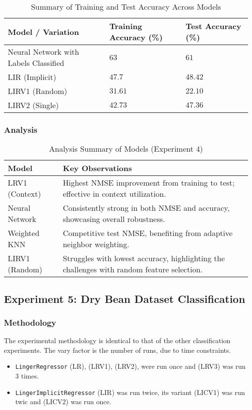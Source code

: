 \documentclass[a4paper, 12pt]{report}
\begin{document}
\begin{table}[H]
    \centering
    \caption{Summary of Training and Test Accuracy Across Models}
    \label{tab:summary_accuracy_all_models_accuracy_exp4}
    \small
    \begin{tabular}{|l|l|l|}
    \toprule
    \textbf{Model / Variation} & \textbf{Training Accuracy (\%)} & \textbf{Test Accuracy (\%)} \\
    \midrule
    Neural Network with Labels Classified & $63$ & $61$ \\
    LIR (Implicit) & $47.7$ & $48.42$ \\
    LIRV1 (Random) & $31.61$ & $22.10$ \\
    LIRV2 (Single) & $42.73$ & $47.36$ \\
    \bottomrule
    \end{tabular}
\end{table}
\clearpage

\subsubsection{Analysis}
\begin{table}[H]
    \centering
    \caption{Analysis Summary of Models (Experiment 4)}
    \label{tab:concise_analysis_summary_exp4}
    \begin{tabular}{|l|l|}
    \hline
    \textbf{Model} & \textbf{Key Observations} \\
    \hline
    LRV1 (Context) & Highest NMSE improvement from training to test; effective in context utilization. \\
    \hline
    Neural Network & Consistently strong in both NMSE and accuracy, showcasing overall robustness. \\
    \hline
    Weighted KNN & Competitive test NMSE, benefiting from adaptive neighbor weighting. \\
    \hline
    LIRV1 (Random) & Struggles with lowest accuracy, highlighting the challenges with random feature selection. \\
    \hline
    \end{tabular}
\end{table}

\subsection{Experiment 5: Dry Bean Dataset Classification}
\subsubsection{Methodology}
The experimental methodology is identical to that of the other classification experiments.
The vary factor is the number of runs, due to time constraints.
\begin{itemize}
    \item \texttt{LingerRegressor} (LR),  (LRV1), (LRV2), were run once and (LRV3) was run 3 times.
    \item \texttt{LingerImplicitRegressor} (LIR) was run twice, its variant (LICV1) was run twic and (LICV2) was run once.
\end{itemize}
\end{document}
